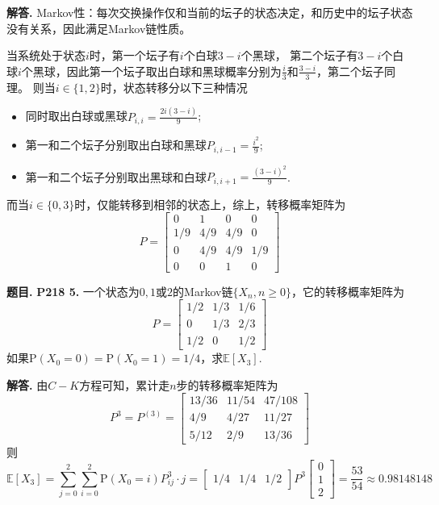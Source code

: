 \documentclass[12pt, a4paper, oneside]{ctexart}
\newcounter{problem}  %
\newenvironment{problem}[1][]{\stepcounter{problem}\par\noindent\textbf{题目\arabic{problem}. #1}}{\smallskip\par}
\newenvironment{solution}[1][]{\par\noindent\textbf{#1解答. }}{\smallskip\par}  %
\def\E{\mathbb{E}}          %
\def\add{\vspace{1ex}}      %
\def\prob{\textrm{P}}       %
\begin{document}
\begin{solution}
    Markov性：每次交换操作仅和当前的坛子的状态决定，和历史中的坛子状态没有关系，因此满足Markov链性质。

    当系统处于状态$i$时，第一个坛子有$i$个白球$3-i$个黑球，\add
    第二个坛子有$3-i$个白球$i$个黑球，因此第一个坛子取出白球和黑球概率分别为$\frac{i}{3}$和$\frac{3-i}{3}$，第二个坛子同理。\add
    则当$i\in\{1,2\}$时，状态转移分以下三种情况
    \begin{itemize}
        \item 同时取出白球或黑球$P_{i,i} = \frac{2i(3-i)}{9}$;
        \item 第一和二个坛子分别取出白球和黑球$P_{i,i-1} = \frac{i^2}{9}$;
        \item 第一和二个坛子分别取出黑球和白球$P_{i,i+1} = \frac{(3-i)^2}{9}$.
    \end{itemize}
    而当$i\in\{0,3\}$时，仅能转移到相邻的状态上，综上，转移概率矩阵为
    \begin{equation*}
        P = \begin{bmatrix}
            0&1&0&0\\
            1/9&4/9&4/9&0\\
            0&4/9&4/9&1/9\\
            0&0&1&0
        \end{bmatrix}
    \end{equation*}
\end{solution}
\begin{problem}
    \textbf{P218 5.}
    一个状态为$0,1$或$2$的Markov链$\{X_n,n\geqslant 0\}$，它的转移概率矩阵为
    \begin{equation*}
        P = \begin{bmatrix}
            1/2&1/3&1/6\\
            0&1/3&2/3\\
            1/2&0&1/2
        \end{bmatrix}
    \end{equation*}
    如果$\prob(X_0=0)=\prob(X_0=1)=1/4$，求$\E[X_3]$.
\end{problem}
\begin{solution}
    由$C-K$方程可知，累计走$n$步的转移概率矩阵为
    \begin{equation*}
        P^3 = P^{(3)} = \begin{bmatrix}
        13/36 & 11/54 & 47/108 \\
        4/9 & 4/27 & 11/27 \\
        5/12 & 2/9 & 13/36
        \end{bmatrix}
    \end{equation*}
    则
    \begin{equation*}
        \E[X_3] = \sum_{j=0}^2\sum_{i=0}^2 \prob(X_0=i)P_{ij}^3\cdot j =
        \begin{bmatrix}
            1/4&1/4&1/2
        \end{bmatrix}P^3\begin{bmatrix}
            0\\1\\2
        \end{bmatrix} = \frac{53}{54}\approx 0.98148148
    \end{equation*}
\end{solution}
\end{document}
